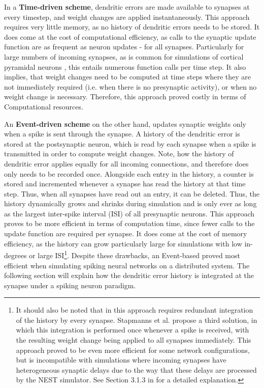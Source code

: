 In a \textbf{Time-driven scheme}, dendritic errors are made available to synapses at every timestep, and weight changes
are applied instantaneously. This approach requires very little memory, as no history of dendritic errors needs to be
stored. It does come at the cost of computational efficiency, as calls to the synaptic update function are as frequent
as neuron updates - for all synapses. Particularly for large numbers of incoming synapses, as is common for simulations
of cortical pyramidal neurons \citep{potjans2014cell}, this entails numerous function calls per time step. It also
implies, that weight changes need to be computed at time steps where they are not immediately required (i.e. when there
is no presynaptic activity), or when no weight change is necessary. Therefore, this approach proved costly in terms of
Computational resources.

An \textbf{Event-driven scheme} on the other hand, updates synaptic weights only when a spike is sent through the
synapse. A history of the dendritic error \intro is stored at the postsynaptic neuron, which is read by each synapse
when a spike is transmitted in order to compute weight changes. Note, how the history of dendritic error applies equally
for all incoming connections, and therefore does only needs to be recorded once. Alongside each entry in the history, a
counter is stored and incremented whenever a synapse has read the history at that time step. Thus, when all synapses
have read out an entry, it can be deleted. Thus, the history dynamically grows and shrinks during simulation and is only
ever as long as the largest inter-spike interval (ISI) of all presynaptic neurons. This approach proves to be more
efficient in terms of computation time, since fewer calls to the update function are required per synapse. It does come
at the cost of memory efficiency, as the history can grow particularly large for simulations with low in-degrees or
large ISI\footnote{It should also be noted that in this approach requires redundant integration of the history by every
  synapse. Stapmanns et al. propose a third solution, in which this integration is performed once whenever a spike is
  received, with the resulting weight change being applied to all synapses immediately. This approach proved to be even
  more efficient for some network configurations, but is incompatible with simulations where incoming synapses have
  heterogeneous synaptic delays due to the way that these delays are processed by the NEST simulator. See Section 3.1.3 in
  \cite{Stapmanns2021} for a detailed explanation.}. Despite these drawbacks, an Event-based proved most efficient when
simulating spiking neural networks on a distributed system. The following section will explain how the dendritic error
history is integrated at the synapse under a spiking neuron paradigm. \newline


